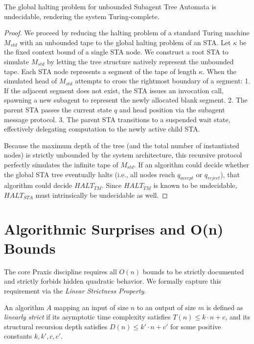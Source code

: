 \begin{theorem}
\label{thm:sta_halting}
The global halting problem for unbounded Subagent Tree Automata is undecidable, rendering the system Turing-complete.
\end{theorem}

\begin{proof}
We proceed by reducing the halting problem of a standard Turing machine $M_{std}$ with an unbounded tape to the global halting problem of an STA.
Let $\kappa$ be the fixed context bound of a single STA node. We construct a root STA to simulate $M_{std}$ by letting the tree structure natively represent the unbounded tape.
Each STA node represents a segment of the tape of length $\kappa$. 
When the simulated head of $M_{std}$ attempts to cross the rightmost boundary of a segment:
1. If the adjacent segment does not exist, the STA issues an invocation call, spawning a new subagent to represent the newly allocated blank segment.
2. The parent STA passes the current state $q$ and head position via the subagent message protocol.
3. The parent STA transitions to a suspended wait state, effectively delegating computation to the newly active child STA.

Because the maximum depth of the tree (and the total number of instantiated nodes) is strictly unbounded by the system architecture, this recursive protocol perfectly simulates the infinite tape of $M_{std}$. If an algorithm could decide whether the global STA tree eventually halts (i.e., all nodes reach $q_{accept}$ or $q_{reject}$), that algorithm could decide $HALT_{TM}$. Since $HALT_{TM}$ is known to be undecidable, $HALT_{STA}$ must intrinsically be undecidable as well.
\end{proof}

\section{Algorithmic Surprises and O(n) Bounds}

The core Praxis discipline requires all $O(n)$ bounds to be strictly documented and strictly forbids hidden quadratic behavior. We formally capture this requirement via the \textit{Linear Strictness Property}.

\begin{definition}
An algorithm $A$ mapping an input of size $n$ to an output of size $m$ is defined as \textit{linearly strict} if its asymptotic time complexity satisfies $T(n) \le k \cdot n + c$, and its structural recursion depth satisfies $D(n) \le k' \cdot n + c'$ for some positive constants $k, k', c, c'$.
\end{definition}

